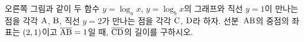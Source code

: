 \noindent\begin{minipage}[t]{0.58\linewidth}\vspace{0pt}\raggedright 오른쪽 그림과 같이 두 함수 $y=\log_a x$, $y=\log_b x$의 그래프와 직선 $y=1$이 만나는 점을 각각 $\mathrm{A}$, $\mathrm{B}$, 직선 $y=2$가 만나는 점을 각각 $\mathrm{C}$, $\mathrm{D}$라 하자. 선분~$\mathrm{AB}$의 중점의 좌표는 $(2{,}\mkern3mu\mathopen{}1)$이고 $\overline{\mathrm{AB}}=1$일 때, $\overline{\mathrm{CD}}$의 길이를 구하시오. \end{minipage}\hfill\begin{minipage}[t]{0.4\linewidth}\vspace{0pt}\centering \resizebox{\ifdim\width>\linewidth\linewidth\else\width\fi}{!}{}\end{minipage}\par
